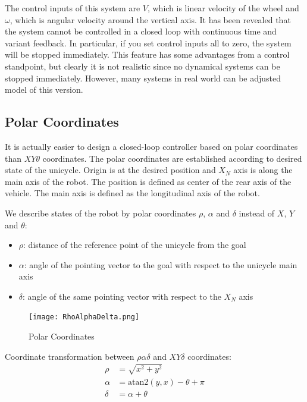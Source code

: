 \documentclass[twoside]{article}
\begin{document}
The control inputs of this system are $V$, which is linear velocity of the wheel and $\omega$, which is angular velocity around the vertical axis. It has been revealed that the system cannot be controlled in a closed loop with continuous time and variant feedback. In particular, if you set control inputs all to zero, the system will be stopped immediately. This feature has some advantages from a control standpoint, but clearly it is not realistic since no dynamical systems can be stopped immediately. However, many systems in real world can be adjusted model of this version.

\subsection{Polar Coordinates}
It is actually easier to design a closed-loop controller based on polar coordinates than $XY\theta$ coordinates. The polar coordinates are established according to desired state of the unicycle. Origin is at the desired position and $X_N$ axis is along the main axis of the robot. The position is defined as center of the rear axis of the vehicle. The main axis is defined as the longitudinal axis of the robot.

We describe states of the robot by polar coordinates $\rho$, $\alpha$ and $\delta$ instead of $X$, $Y$ and $\theta$:
\begin{itemize}
  \item $\rho$: distance of the reference point of the unicycle from the goal
  \item $\alpha$: angle of the pointing vector to the goal with respect to the unicycle main axis
  \item $\delta$: angle of the same pointing vector with respect to the $X_N$ axis
\end{itemize}

\begin{figure}[h]
\centering
\texttt{[image: RhoAlphaDelta.png]}
\caption{Polar Coordinates}
\label{RhoAlphaDeltaFigure}
\end{figure}

Coordinate transformation between $\rho\alpha\delta$ and $XY\delta$ coordinates:
\begin{equation} \label{coordinate transformation}
\begin{split}
\rho &= \sqrt{x^2+y^2} \\
\alpha &= \mathrm{atan2}(y, x) - \theta + \pi \\
\delta &= \alpha + \theta \\
\end{split}
\end{equation}
\end{document}
